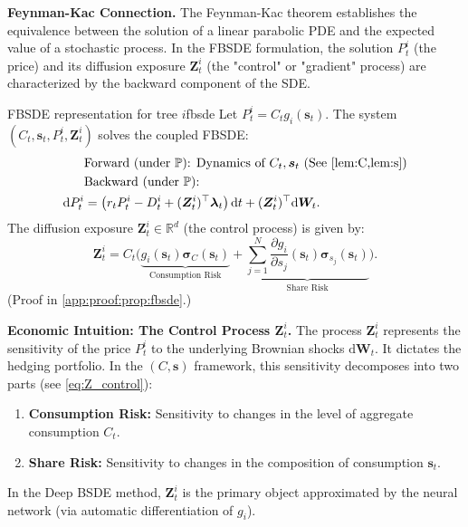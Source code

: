 \documentclass[11pt,letterpaper,oneside]{article}
\numberwithin{equation}{section}
\newcommand{\R}{\mathbb{R}}
\newcommand{\1}{\mathbf{1}}
\newcommand{\diff}{\mathrm{d}}
\begin{document}
\begin{tcolorbox}[mathstyle]
    \textbf{Feynman-Kac Connection.} The Feynman-Kac theorem establishes the equivalence between the solution of a linear parabolic PDE and the expected value of a stochastic process. In the FBSDE formulation, the solution $P_t^i$ (the price) and its diffusion exposure $\bm{Z}_t^i$ (the "control" or "gradient" process) are characterized by the backward component of the SDE.

\begin{proposition}{FBSDE representation for tree $i$}{fbsde}
Let $P_t^i=C_t g_i(\bm{s}_t)$. The system $(C_t,\bm{s}_t,P_t^i,\bm{Z}_t^i)$ solves the coupled FBSDE:
\begin{align}
  &\text{Forward (under }\mathbb{P}\text{): Dynamics of } C_t, \bm{s}_t \text{ (See \cref{lem:C,lem:s})}\\
  &\text{Backward (under }\mathbb{P}\text{):}\\
  \diff P_t^i &= \big(r_t P_t^i - D_t^i + (\bm{Z}_t^i)^{\top}\bm{\lambda}_t\big)\,\diff t + (\bm{Z}_t^i)^{\top}\diff\bm{W}_t.
\end{align}
The diffusion exposure $\bm{Z}_t^i \in \R^d$ (the control process) is given by:
\begin{equation}\label{eq:Z_control}
  \bm{Z}_t^i = C_t \Big( \underbrace{g_i(\bm{s}_t)\bm{\sigma}_C(\bm{s}_t)}_{\text{Consumption Risk}} + \underbrace{\sum_{j=1}^N \frac{\partial g_i}{\partial s_j}(\bm{s}_t)\bm{\sigma}_{s_j}(\bm{s}_t)}_{\text{Share Risk}} \Big).
\end{equation}
(Proof in \cref{app:proof:prop:fbsde}.)
\end{proposition}

\begin{tcolorbox}[didacticstyle]
    \textbf{Economic Intuition: The Control Process $\bm{Z}_t^i$.}
    The process $\bm{Z}_t^i$ represents the sensitivity of the price $P_t^i$ to the underlying Brownian shocks $\diff\bm{W}_t$. It dictates the hedging portfolio. In the $(C,\bm{s})$ framework, this sensitivity decomposes into two parts (see \eqref{eq:Z_control}):
    \begin{enumerate}[leftmargin=1.25em]
        \item \textbf{Consumption Risk:} Sensitivity to changes in the level of aggregate consumption $C_t$.
        \item \textbf{Share Risk:} Sensitivity to changes in the composition of consumption $\bm{s}_t$.
    \end{enumerate}
    In the Deep BSDE method, $\bm{Z}_t^i$ is the primary object approximated by the neural network (via automatic differentiation of $g_i$).

\end{tcolorbox}
\end{tcolorbox}
\end{document}
